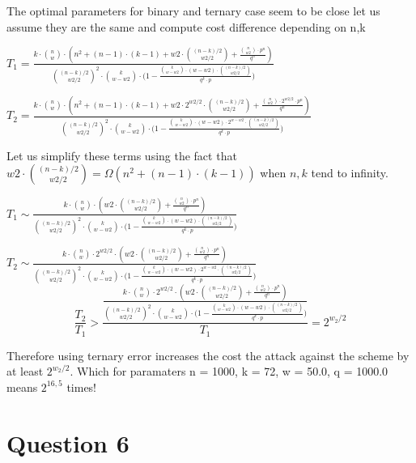 \documentclass[12pt]{article}
\begin{document}
The optimal parameters for binary and ternary case seem to be close let us assume they are the same and compute cost difference depending on n,k


$T_1 = \frac{ k \cdot  \binom{n}{w} \cdot  (n^2 + (n-1)\cdot (k-1) + w2\cdot \binom{(n-k)/2}{w2/2} + \frac{\binom{n}{w2}\cdot p^n}{q^n})}{\binom{(n-k)/2}{w2/2}^2 \cdot  \binom{k}{w-w2} \cdot  \big( 1 - \frac{\binom{k}{w-w2} \cdot  (w-w2) \cdot  \binom{(n-k)/2}{w2/2} }{ q^{k}\cdot p } \big)}$


$T_2 = \frac{ k \cdot  \binom{n}{w} \cdot  (n^2 + (n-1)\cdot (k-1) + w2\cdot 2^{w2/2}\cdot \binom{(n-k)/2}{w2/2} + \frac{\binom{n}{w2}\cdot 2^{w2/2}\cdot p^n}{q^n})}{\binom{(n-k)/2}{w2/2}^2 \cdot  \binom{k}{w-w2} \cdot  \big( 1 - \frac{\binom{k}{w-w2} \cdot  (w-w2) \cdot  2^{w-w2} \cdot  \binom{(n-k)/2}{w2/2} }{ q^{k}\cdot p } \big)}$

Let us simplify these terms using the fact that $w2\cdot \binom{(n-k)/2}{w2/2} = \Omega(n^2 + (n-1)\cdot (k-1))$ when $n,k$ tend to infinity.

$T_1 \sim \frac{ k \cdot  \binom{n}{w} \cdot  (w2\cdot \binom{(n-k)/2}{w2/2} + \frac{\binom{n}{w2}\cdot p^n}{q^n})}{\binom{(n-k)/2}{w2/2}^2 \cdot  \binom{k}{w-w2} \cdot  \big( 1 - \frac{\binom{k}{w-w2} \cdot  (w-w2) \cdot  \binom{(n-k)/2}{w2/2} }{ q^{k}\cdot p } \big)}$


$T_2 \sim \frac{ k \cdot  \binom{n}{w} \cdot  2^{w2/2} \cdot  (w2\cdot \binom{(n-k)/2}{w2/2} + \frac{\binom{n}{w2}\cdot p^n}{q^n})}{\binom{(n-k)/2}{w2/2}^2 \cdot  \binom{k}{w-w2} \cdot  \big( 1 - \frac{\binom{k}{w-w2} \cdot  (w-w2) \cdot  2^{w-w2} \cdot  \binom{(n-k)/2}{w2/2} }{ q^{k}\cdot p } \big)}$
\[
    \frac{T_2}{T_1} > \frac{\frac{ k \cdot  \binom{n}{w} \cdot  2^{w2/2} \cdot  (w2\cdot \binom{(n-k)/2}{w2/2} + \frac{\binom{n}{w2}\cdot p^n}{q^n})}{\binom{(n-k)/2}{w2/2}^2 \cdot  \binom{k}{w-w2} \cdot  \big( 1 - \frac{\binom{k}{w-w2} \cdot  (w-w2) \cdot  \binom{(n-k)/2}{w2/2} }{ q^{k}\cdot p } \big)}}{T_1} = 2^{w_2/2}
\]

Therefore using ternary error increases the cost the attack against the scheme by at least $2^{w_2/2}$. Which for paramaters n = 1000, k = 72, w = 50.0, q = 1000.0 means $2^{16,5}$ times!

\section{Question 6}




\end{document}
